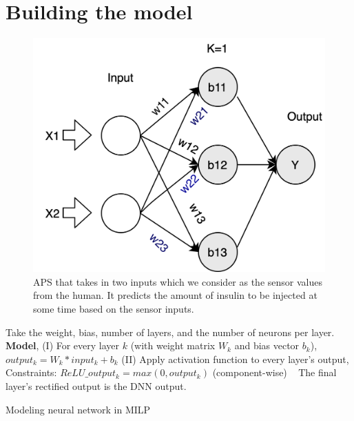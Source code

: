 \section{Building the model}
\label{section:attacks}

\begin{figure}
	\centering
	\includegraphics[width=0.7\linewidth]{Images/ToyAPS}
	\caption[APS]{APS that takes in two inputs which we consider as the sensor values from the human. It predicts the amount of insulin to be injected at some time based on the sensor inputs.}
	\label{fig:toyaps}
\end{figure}


\begin{algorithm}
	Take the weight, bias, number of layers, and the number of neurons per layer. \\
	
	\textbf{Model}, \linebreak
	(I) For every layer $k$ (with weight matrix $W_k$ and bias vector $b_k$), $output_k = W_k * input_k + b_k$
	\linebreak
	(II) Apply activation function to every layer's output,
	\linebreak
	Constraints: $ReLU\_output_k = max(0, output_k)$ (component-wise) \
	\linebreak
	The final layer's rectified output is the DNN output.
	
	\caption{Modeling neural network in MILP}
	\label{algo:b}
\end{algorithm}


